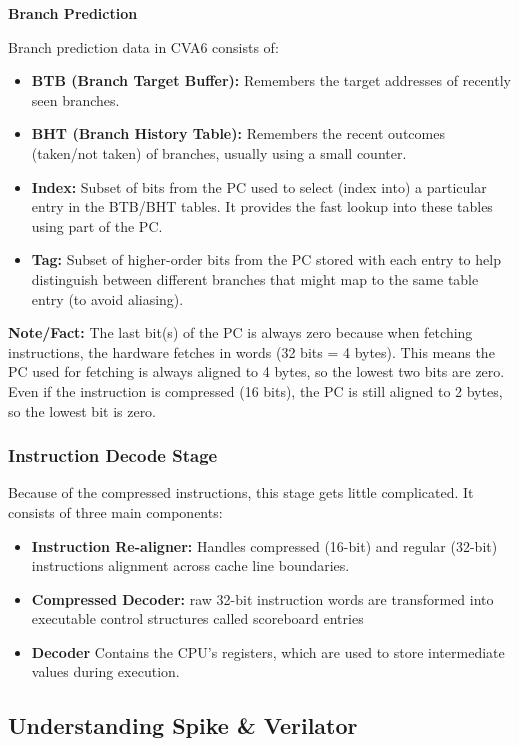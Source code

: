 \documentclass[12pt, a4paper]{article}
\begin{document}
\vspace{0.5em}

\textbf{Branch Prediction}

Branch prediction data in CVA6 consists of:
\begin{itemize}[nosep]
    \item \textbf{BTB (Branch Target Buffer):} Remembers the target addresses of recently seen branches.
    \item \textbf{BHT (Branch History Table):} Remembers the recent outcomes (taken/not taken) of branches, usually using a small counter.
    \item \textbf{Index:} Subset of bits from the PC used to select (index into) a particular entry in the BTB/BHT tables. It provides the fast lookup into these tables using part of the PC.
    \item \textbf{Tag:} Subset of higher-order bits from the PC stored with each entry to help distinguish between different branches that might map to the same table entry (to avoid aliasing).
\end{itemize}

\textbf{Note/Fact:} The last bit(s) of the PC is always zero because when fetching instructions, the hardware fetches in words (32 bits = 4 bytes). This means the PC used for fetching is always aligned to 4 bytes, so the lowest two bits are zero. 
Even if the instruction is compressed (16 bits), the PC is still aligned to 2 bytes, so the lowest bit is zero.

\subsubsection{Instruction Decode Stage}
Because of the compressed instructions, this stage gets little complicated. It consists of three main components:
\begin{itemize}[nosep]
    \item \textbf{Instruction Re-aligner:} Handles compressed (16-bit) and regular (32-bit) instructions alignment across cache line boundaries.
    \item \textbf{Compressed Decoder:} raw 32-bit instruction words are transformed into executable control structures called scoreboard entries
    \item \textbf{Decoder} Contains the CPU's registers, which are used to store intermediate values during execution.
\end{itemize}


\subsection{Understanding Spike \& Verilator}
\end{document}
